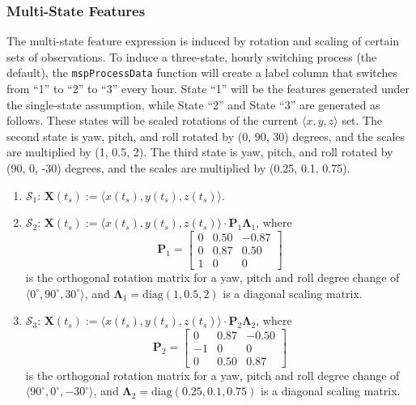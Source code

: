 \documentclass{report}\usepackage[]{graphicx}\usepackage[]{color}
\begin{document}
\subsubsection{Multi-State Features}
The multi-state feature expression is induced by rotation and scaling of certain sets of observations. To induce a three-state, hourly switching process (the default), the \texttt{mspProcessData} function will create a label column that switches from ``1'' to ``2'' to ``3'' every hour. State ``1'' will be the features generated under the single-state assumption, while State ``2'' and State ``3'' are generated as follows. These states will be scaled rotations of the current $\langle x,y,z \rangle$ set. The second state is yaw, pitch, and roll rotated by (0, 90, 30) degrees, and the scales are multiplied by (1, 0.5, 2). The third state is yaw, pitch, and roll rotated by (90, 0, -30) degrees, and the scales are multiplied by (0.25, 0.1, 0.75).
\begin{enumerate}
\item $\mathcal{S}_1$: $\textbf{X}(t_s) := \langle x(t_s), y(t_s), z(t_s)\rangle$.

\item $\mathcal{S}_2$: $\textbf{X}(t_s) := \langle x(t_s), y(t_s), z(t_s)\rangle \cdot \textbf{P}_1\boldsymbol\Lambda_1$, where
\[
  \textbf{P}_1 = \begin{bmatrix}
  0    &  0.50 & -0.87 \\
  0    &  0.87 &  0.50 \\
  1    &  0    &  0
  \end{bmatrix}
\]
is the orthogonal rotation matrix for a yaw, pitch and roll degree change of $\langle 0^{\circ}, 90^{\circ}, 30^{\circ} \rangle$, and $\boldsymbol\Lambda_1 = \text{diag}(1, 0.5, 2)$ is a diagonal scaling matrix.

\item $\mathcal{S}_3$: $\textbf{X}(t_s) := \langle x(t_s), y(t_s), z(t_s)\rangle \cdot \textbf{P}_2\boldsymbol\Lambda_2$, where
\[
  \textbf{P}_2 = \begin{bmatrix}
  0    &  0.87 & -0.50 \\
  -1    &  0    &  0    \\
  0    &  0.50 &  0.87
  \end{bmatrix}
\]
is the orthogonal rotation matrix for a yaw, pitch and roll degree change of $\langle 90^{\circ}, 0^{\circ}, -30^{\circ} \rangle$, and $\boldsymbol\Lambda_2 = \text{diag}(0.25, 0.1, 0.75)$ is a diagonal scaling matrix.
\end{enumerate}
\end{document}
